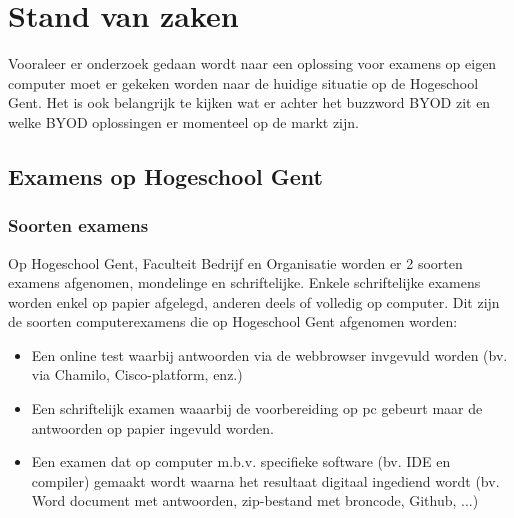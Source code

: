 \chapter{Stand van zaken}
\label{ch:stand-van-zaken}



Vooraleer er onderzoek gedaan wordt naar een oplossing voor examens op eigen computer moet er gekeken worden naar de huidige situatie op de Hogeschool Gent. Het is ook belangrijk te kijken wat er achter het buzzword BYOD zit en welke BYOD oplossingen er momenteel op de markt zijn. 

\section{Examens op Hogeschool Gent}

\subsection{Soorten examens}
Op Hogeschool Gent, Faculteit Bedrijf en Organisatie worden er 2 soorten examens afgenomen, mondelinge en schriftelijke. Enkele schriftelijke examens worden enkel op papier afgelegd, anderen deels of volledig op computer. Dit zijn de soorten computerexamens die op Hogeschool Gent afgenomen worden:
\begin{itemize}
\item Een online test waarbij antwoorden via de webbrowser invgevuld worden (bv. via Chamilo, Cisco-platform, enz.)
\item Een schriftelijk examen waaarbij de voorbereiding op pc gebeurt maar de antwoorden op papier ingevuld worden.
\item Een examen dat op computer m.b.v. specifieke software (bv. IDE en compiler) gemaakt wordt waarna het resultaat digitaal ingediend wordt (bv. Word document met antwoorden, zip-bestand met broncode, Github, ...)
\end{itemize}


